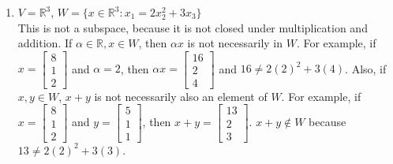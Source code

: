 \documentclass[11pt]{amsart}
\theoremstyle{plain}
\theoremstyle{definition}
\begin{document}
\begin{enumerate}
\begin{enumerate}
\item $V = \mathbb{R}^3$, $W  = \{x \in \mathbb{R}^3 : x_1  = 2x_2^2  + 3x_3\}$ \\
This is not a subspace, because it is not closed under multiplication and addition. If $\alpha \in \mathbb{R}, x \in W$, then $\alpha  x$ is not necessarily in $W$. For example, if $x = \begin{bmatrix} 8 \\ 1 \\ 2 \end{bmatrix}$ and $\alpha = 2$, then $\alpha x = \begin{bmatrix} 16 \\ 2 \\ 4 \end{bmatrix}$ and $16 \neq 2(2)^2 + 3(4)$. Also, if $x, y \in W$, $x + y$ is not necessarily also an element of $W$. For example, if $x = \begin{bmatrix} 8 \\ 1 \\ 2 \end{bmatrix}$ and $y = \begin{bmatrix} 5 \\ 1 \\ 1 \end{bmatrix}$, then $x + y = \begin{bmatrix} 13 \\ 2 \\ 3 \end{bmatrix}$. $x + y \notin W$ because $13 \neq 2(2)^2 + 3(3)$. \\


\end{enumerate}
\end{enumerate}
\end{document}
